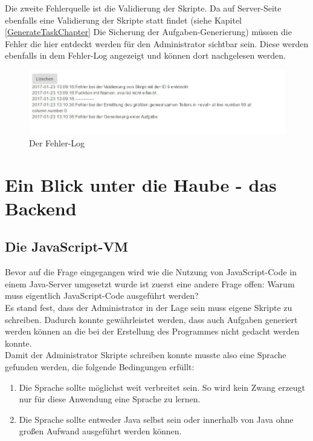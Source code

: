 Die zweite Fehlerquelle ist die Validierung der Skripte. Da auf Server-Seite ebenfalls eine Validierung der Skripte statt findet (siehe Kapitel \ref{GenerateTaskChapter} Die Sicherung der Aufgaben-Generierung) müssen die Fehler die hier entdeckt werden für den Administrator sichtbar sein. Diese werden ebenfalls in dem Fehler-Log angezeigt und können dort nachgelesen werden.

\begin{figure}[htp]     %
\centering
\includegraphics[width=1\textwidth]{bilder/ErrorLog} 
\caption[Der Fehler-Log]{Der Fehler-Log}
\end{figure} 




\chapter{Ein Blick unter die Haube - das Backend}




\section{Die JavaScript-VM}

Bevor auf die Frage eingegangen wird wie die Nutzung von JavaScript-Code in einem Java-Server umgesetzt wurde ist zuerst eine andere Frage offen: Warum muss eigentlich JavaScript-Code ausgeführt werden? \\

Es stand fest, dass der Administrator in der Lage sein muss eigene Skripte zu schreiben. Dadurch konnte gewährleistet werden, dass auch Aufgaben generiert werden können an die bei der Erstellung des Programmes nicht gedacht werden konnte. \\
Damit der Administrator Skripte schreiben konnte musste also eine Sprache gefunden werden, die folgende Bedingungen erfüllt:
\begin{enumerate}
\item Die Sprache sollte möglichst weit verbreitet sein. So wird kein Zwang erzeugt nur für diese Anwendung eine Sprache zu lernen.
\item Die Sprache sollte entweder Java selbst sein oder innerhalb von Java ohne großen Aufwand ausgeführt werden können.
\end{enumerate}


